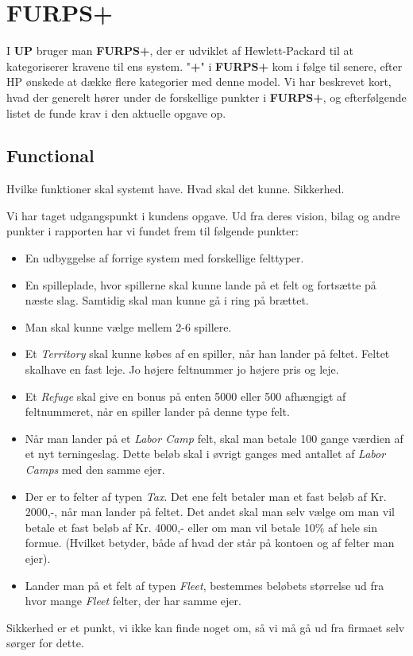 \section{FURPS+}
I \textbf{UP} bruger man \textbf{FURPS+}, der er udviklet af Hewlett-Packard til at kategoriserer kravene til ens system. "\textbf{+}" i \textbf{FURPS+} kom i følge \cite{WikiFURPS} til senere, efter HP ønskede at dække flere kategorier med denne model. Vi har beskrevet kort, hvad der generelt hører under de forskellige punkter i \textbf{FURPS+}, og efterfølgende listet de funde krav i den aktuelle opgave op.
\subsection{Functional}
Hvilke funktioner skal systemt have. Hvad skal det kunne. Sikkerhed.


Vi har taget udgangspunkt i kundens \cite{CDIO3} opgave. Ud fra deres vision, bilag og andre punkter i rapporten har vi fundet frem til følgende punkter:
\begin{itemize}
\item En udbyggelse af forrige system med forskellige felttyper.
\item En spilleplade, hvor spillerne skal kunne lande på et felt og fortsætte på næste slag. Samtidig skal man kunne gå i ring på brættet.
\item Man skal kunne vælge mellem 2-6 spillere.
\item Et \textit{Territory} skal kunne købes af en spiller, når han lander på feltet. Feltet skalhave en fast leje. Jo højere feltnummer jo højere pris og leje.
\item Et \textit{Refuge} skal give en bonus på enten 5000 eller 500 afhængigt af feltnummeret, når en spiller lander på denne type felt.
\item Når man lander på et \textit{Labor Camp} felt, skal man betale 100 gange værdien af et nyt terningeslag. Dette beløb skal i øvrigt ganges med antallet af \textit{Labor Camps} med den samme ejer.
\item Der er to felter af typen \textit{Tax}. Det ene felt betaler man et fast beløb af Kr. 2000,-, når man lander på feltet. Det andet skal man selv vælge om man vil betale et fast beløb af Kr. 4000,- eller om man vil betale 10\% af hele sin formue. (Hvilket betyder, både af hvad der står på kontoen og af felter man ejer).
\item Lander man på et felt af typen \textit{Fleet}, bestemmes beløbets størrelse ud fra hvor mange \textit{Fleet} felter, der har samme ejer.
\end{itemize}
Sikkerhed er et punkt, vi ikke kan finde noget om, så vi må gå ud fra firmaet selv sørger for dette.
